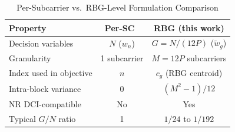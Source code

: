 \begin{table}[t]
  \centering
  \caption{Per-Subcarrier vs.\ RBG-Level Formulation Comparison}
  \label{tab:comparison}
  \begin{tabular}{@{}lcc@{}}
    \toprule
    \textbf{Property} & \textbf{Per-SC~\cite{ldsa}} & \textbf{RBG (this work)} \\
    \midrule
    Decision variables       & $N$ ($w_n$)       & $G = N/(12P)$ ($\tilde{w}_g$) \\
    Granularity              & 1 subcarrier      & $M = 12P$ subcarriers \\
    Index used in objective  & $n$               & $c_g$ (RBG centroid) \\
    Intra-block variance     & 0                 & $(M^2 - 1)/12$ \\
    NR DCI-compatible        & No                & Yes \\
    Typical $G/N$ ratio      & 1                 & $1/24$ to $1/192$ \\
    \bottomrule
  \end{tabular}
\end{table}
